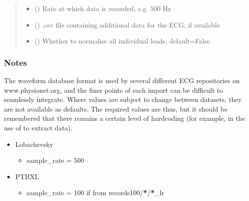 \documentclass[letterpaper,10pt,english]{sphinxmanual}
\begin{document}
\begin{fulllineitems}
\begin{fulllineitems}
\begin{quote}
\begin{description}
\begin{itemize}
\item {} 
\sphinxAtStartPar
{} () \textendash{} Rate at which data is recorded, e.g. 500 Hz

\item {} 
\sphinxAtStartPar
{} (\sphinxstyleliteralemphasis{\sphinxupquote{, }}) \textendash{} .csv file containing additional data for the ECG, if available

\item {} 
\sphinxAtStartPar
{} (\sphinxstyleliteralemphasis{\sphinxupquote{, }}) \textendash{} Whether to normalise all individual leads, default=False

\end{itemize}

\end{description}\end{quote}
\subsubsection*{Notes}

\sphinxAtStartPar
The waveform database format is used by several different ECG repositories on www.physionet.org,
and the finer points of each import can be difficult to seamlessly integrate. Where values are subject to
change between datasets, they are not available as defaults. The required values are thus, but it should be
remembered that there remains a certain level of hard\sphinxhyphen{}coding (for example, in the use of  to
extract data).
\begin{itemize}
\item {} 
\sphinxAtStartPar
Lobachevsky
\begin{itemize}
\item {} 
\sphinxAtStartPar
sample\_rate = 500

\end{itemize}

\item {} 
\sphinxAtStartPar
PTB\sphinxhyphen{}XL
\begin{itemize}
\item {} 
\sphinxAtStartPar
sample\_rate = 100 if from records100/{\color{red}\bfseries{}*}/{\color{red}\bfseries{}*}\_lr


\end{itemize}
\end{itemize}
\end{fulllineitems}
\end{fulllineitems}
\end{document}
